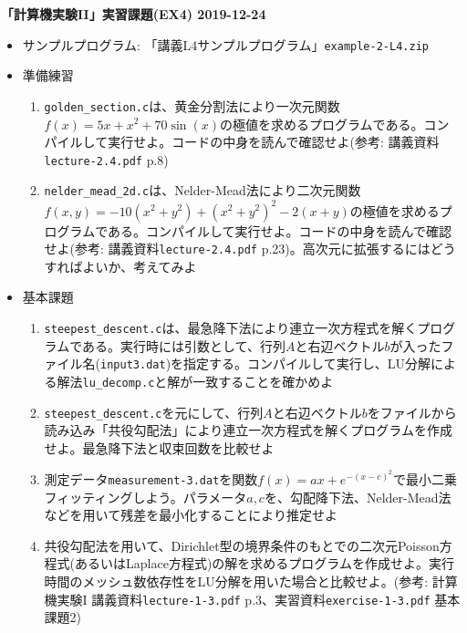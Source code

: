\documentclass[11pt]{jarticle}
\begin{document}
\noindent
{\bf\large 「計算機実験II」実習課題(EX4) 2019-12-24}
\\[-0.5em]

\noindent
\begin{itemize}

\item サンプルプログラム: 「講義L4サンプルプログラム」{\tt example-2-L4.zip}

\item 準備練習
  
\begin{enumerate}
  \item {\tt golden\_section.c}は、黄金分割法により一次元関数$f(x) = 5x+x^2+70\sin(x)$の極値を求めるプログラムである。コンパイルして実行せよ。コードの中身を読んで確認せよ(参考: 講義資料{\tt lecture-2.4.pdf} p.8)
  \item {\tt nelder\_mead\_2d.c}は、Nelder-Mead法により二次元関数$f(x, y) = −10(x^2 + y^2) + (x^2 + y^2)^2 − 2(x + y)$の極値を求めるプログラムである。コンパイルして実行せよ。コードの中身を読んで確認せよ(参考: 講義資料{\tt lecture-2.4.pdf} p.23)。高次元に拡張するにはどうすればよいか、考えてみよ
\end{enumerate}

\item 基本課題
  \begin{enumerate}
  \item {\tt steepest\_descent.c}は、最急降下法により連立一次方程式を解くプログラムである。実行時には引数として、行列$A$と右辺ベクトル$b$が入ったファイル名({\tt input3.dat})を指定する。コンパイルして実行し、LU分解による解法{\tt lu\_decomp.c}と解が一致することを確かめよ
  \item {\tt steepest\_descent.c}を元にして、行列$A$と右辺ベクトル$b$をファイルから読み込み「共役勾配法」により連立一次方程式を解くプログラムを作成せよ。最急降下法と収束回数を比較せよ
  \item 測定データ{\tt measurement-3.dat}を関数$f(x)=ax+e^{−(x−c)^2}$で最小二乗フィッティングしよう。パラメータ$a, c$を、勾配降下法、Nelder-Mead法などを用いて残差を最小化することにより推定せよ
  \item 共役勾配法を用いて、Dirichlet型の境界条件のもとでの二次元Poisson方程式(あるいはLaplace方程式)の解を求めるプログラムを作成せよ。実行時間のメッシュ数依存性をLU分解を用いた場合と比較せよ。(参考: 計算機実験I 講義資料{\tt lecture-1-3.pdf} p.3、実習資料{\tt exercise-1-3.pdf} 基本課題2)


\end{enumerate}
\end{itemize}
\end{document}
